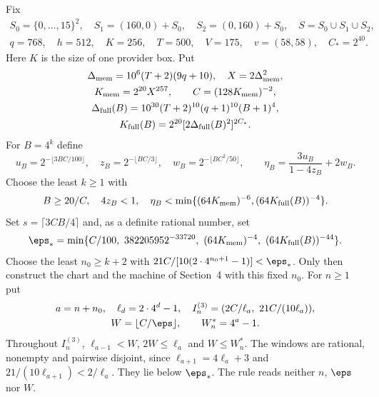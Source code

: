Fix
\[
 \begin{gathered}
 S_0=\{0,\ldots,15\}^2,\quad S_1=(160,0)+S_0,\quad
 S_2=(0,160)+S_0,\quad S=S_0\cup S_1\cup S_2,\\
 q=768,\quad h=512,\quad K=256,\quad T=500,\quad
 V=175,\quad v=(58,58),\quad C_*=2^{40}.
 \end{gathered}
\]
Here $K$ is the size of one provider box. Put
\begin{equation}\label{eq:three-memory-constants}
 \begin{gathered}
 \Delta_{\rm mem}=10^6(T+2)(9q+10),\quad X=2\Delta_{\rm mem}^2,\\
 K_{\rm mem}=2^{20}X^{257},\qquad C=(128K_{\rm mem})^{-2},\\
 \Delta_{\rm full}(B)=10^{30}(T+2)^{10}(q+1)^{10}(B+1)^4,\\
 K_{\rm full}(B)=2^{20}[2\Delta_{\rm full}(B)^2]^{2C_*}.
 \end{gathered}
\end{equation}
For $B=4^k$ define
\[
 u_B=2^{-\lfloor3BC/100\rfloor},\quad
 z_B=2^{-\lfloor BC/3\rfloor},\quad
 w_B=2^{-\lfloor BC^2/50\rfloor},\qquad
 \eta_B=\frac{3u_B}{1-4z_B}+2w_B.
\]
Choose the least $k\ge1$ with
\begin{equation}\label{eq:three-B-search}
 B\ge20/C,\quad4z_B<1,\quad
 \eta_B<\min\{(64K_{\rm mem})^{-6},(64K_{\rm full}(B))^{-4}\}.
\end{equation}
Set $s=\lceil3CB/4\rceil$ and, as a definite rational number, set
\begin{equation}\label{eq:three-epsstar}
 \eps_* =\min\{C/100,\ 382205952^{-33720},\
 (64K_{\rm mem})^{-4},\ (64K_{\rm full}(B))^{-44}\}.
\end{equation}
Choose the least $n_0\ge k+2$ with $21C/[10(2\cdot4^{n_0+1}-1)]<\eps_*$. Only then construct the chart and the machine of Section~4 with this fixed $n_0$. For $n\ge1$ put
\begin{equation}\label{eq:three-windows}
 \begin{gathered}
 a=n+n_0,\quad \ell_d=2\cdot4^d-1,\quad
 I_n^{(3)}=(2C/\ell_a,\ 21C/(10\ell_a)),\\
 W=\lfloor C/\eps\rfloor,\qquad W_n^*=4^a-1.
 \end{gathered}
\end{equation}
Throughout $I_n^{(3)}$, $\ell_{a-1}<W$, $2W\le\ell_a$ and $W\le W_n^*$. The windows are rational, nonempty and pairwise disjoint, since $\ell_{a+1}=4\ell_a+3$ and $21/(10\ell_{a+1})<2/\ell_a$. They lie below $\eps_*$. The rule reads neither $n$, $\eps$ nor $W$.

